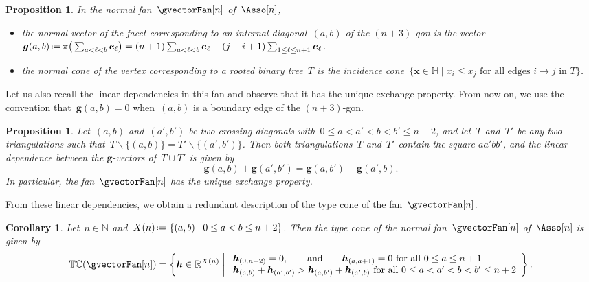 \documentclass{amsart}
\newtheorem{corollary}[theorem]{Corollary}
\newtheorem{proposition}[theorem]{Proposition}
\theoremstyle{definition}
\newcommand{\R}{\mathbb{R}} %
\newcommand{\N}{\mathbb{N}} %
\newcommand{\HH}{\mathbb{H}} %
\renewcommand{\b}[1]{{\boldsymbol{#1}}} %
\newcommand{\set}[2]{\left\{ #1 \;\middle|\; #2 \right\}} %
\newcommand{\bigset}[2]{\big\{ #1 \;\big|\; #2 \big\}} %
\newcommand{\ssm}{\smallsetminus} %
\newcommand{\eqdef}{\mbox{\,\raisebox{0.2ex}{\scriptsize\ensuremath{\mathrm:}}\ensuremath{=}\,}} %
\newcommand{\gvector}[1]{\b{g}(#1)} %
\newcommand{\typeCone}{\mathbb{TC}} %
\begin{document}
\begin{proposition}
\label{prop:normalFanLoday}
In the normal fan~$\gvectorFan[n]$ of~$\Asso[n]$, 
\begin{itemize}
\item the normal vector of the facet corresponding to an internal diagonal~$(a,b)$ of the $(n+3)$-gon is the vector~$\gvector{a,b} \eqdef \pi\big( \sum_{a < \ell < b} \b{e}_\ell \big) = (n+1) \sum_{a < \ell < b} \b{e}_\ell - (j-i+1) \sum_{1 \le \ell \le n+1} \b{e}_\ell$.
\item the normal cone of the vertex corresponding to a rooted binary tree~$T$ is the incidence cone~$\bigset{\b{x} \in \HH}{x_i \le x_j \text{ for all edges $i \to j$ in $T$}}$.
\end{itemize}
\end{proposition}

Let us also recall the linear dependencies in this fan and observe that it has the unique exchange property.
From now on, we use the convention that~$\gvector{a,b} = 0$ when~$(a,b)$ is a boundary edge of the $(n+3)$-gon.

\begin{proposition}
\label{prop:exchangeablePairsAsso}
Let~$(a,b)$ and~$(a',b')$ be two crossing diagonals with~${0 \le a < a' < b < b' \le n+2}$, and let~$T$ and~$T'$ be any two triangulations such that~$T \ssm \{(a,b)\} = T' \ssm \{(a',b')\}$.
Then both triangulations~$T$ and~$T'$ contain the square $aa'bb'$, and the linear dependence between the $\b{g}$-vectors of~$T \cup T'$ is given by
\[
\gvector{a,b} + \gvector{a',b'} = \gvector{a,b'} + \gvector{a',b}.
\]
In particular, the fan~$\gvectorFan[n]$ has the unique exchange property.
\end{proposition}

From these linear dependencies, we obtain a redundant description of the type cone of the fan~$\gvectorFan[n]$.

\begin{corollary}
\label{coro:typeConeAsso}
Let~$n \in \N$ and~$X(n) \eqdef \set{(a,b)}{0 \le a < b \le n+2}$. Then the type cone of the normal fan~$\gvectorFan[n]$ of~$\Asso[n]$ is given by
\[
\typeCone(\gvectorFan[n]) = \set{\b{h} \in \R^{X(n)}}{\begin{array}{l} \b{h}_{(0,n+2)} = 0, \qquad\text{and}\qquad \b{h}_{(a,a+1)} = 0 \text{ for all } 0 \le a \le n+1 \\ \b{h}_{(a,b)} + \b{h}_{(a',b')} > \b{h}_{(a,b')} + \b{h}_{(a',b)} \text{ for all } 0 \le a < a' < b < b' \le n+2 \end{array}}.
\]
\end{corollary}
\end{document}
